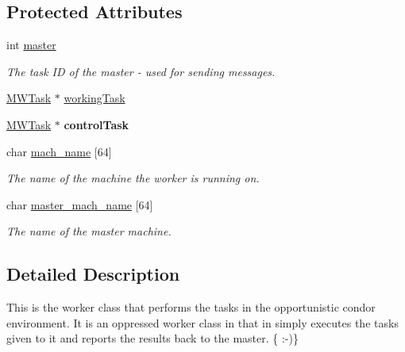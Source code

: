 \subsection*{Protected Attributes}
\begin{DoxyCompactItemize}
\item 
\mbox{\label{classMWWorker_a7511ee3da13dac338c4d0d97a589937b}} 
int \hyperlink{classMWWorker_a7511ee3da13dac338c4d0d97a589937b}{master}
\begin{DoxyCompactList}\small\item\em The task ID of the master -\/ used for sending messages. \end{DoxyCompactList}\item 
\hyperlink{classMWTask}{M\+W\+Task} $\ast$ \hyperlink{classMWWorker_acbd928ad8c2d7a66b9077d5127408bed}{working\+Task}
\item 
\mbox{\label{classMWWorker_a881f8e6d0dfb3c21f49dad7ff50e64f1}} 
\hyperlink{classMWTask}{M\+W\+Task} $\ast$ {\bfseries control\+Task}
\item 
\mbox{\label{classMWWorker_a483214a078c164ece7b4b545761b48a1}} 
char \hyperlink{classMWWorker_a483214a078c164ece7b4b545761b48a1}{mach\+\_\+name} \mbox{[}64\mbox{]}
\begin{DoxyCompactList}\small\item\em The name of the machine the worker is running on. \end{DoxyCompactList}\item 
\mbox{\label{classMWWorker_a1a4ee2d03564b36547585e068f0c1bad}} 
char \hyperlink{classMWWorker_a1a4ee2d03564b36547585e068f0c1bad}{master\+\_\+mach\+\_\+name} \mbox{[}64\mbox{]}
\begin{DoxyCompactList}\small\item\em The name of the master machine. \end{DoxyCompactList}\end{DoxyCompactItemize}


\subsection{Detailed Description}
This is the worker class that performs the tasks in the opportunistic condor environment. It is an oppressed worker class in that in simply executes the tasks given to it and reports the results back to the master. \{ \+:-\/)\}

